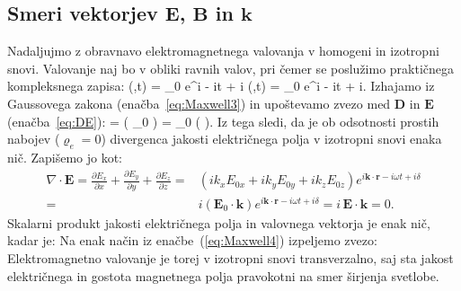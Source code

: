 \subsection*{Smeri vektorjev $\mathbf{E}$, $\mathbf{B}$ in $\mathbf{k}$}
Nadaljujmo z obravnavo elektromagnetnega valovanja v homogeni in izotropni snovi. 
Valovanje naj bo v obliki ravnih valov, pri čemer se poslužimo praktičnega kompleksnega zapisa:
\beq
{}(,t) = _0 e^{i\cdot {} - i\omega t + i\delta}
\qquad {} \qquad
{}(,t) = _0 e^{i\cdot {} - i\omega t + i\delta}.
\label{eq:ravnivalkompleks}
\eeq
Izhajamo iz Gaussovega zakona (enačba~\ref{eq:Maxwell3}) in upoštevamo zvezo med 
$\mathbf{D}$ in $\mathbf{E}$ (enačba~\ref{eq:DE}): 
\beq
\nabla \cdot {} = \nabla \cdot \left( \varepsilon \varepsilon_0 \right) 
= \varepsilon \varepsilon_0 \left(\nabla \cdot {} \right)\!.
\label{eq:03_20}
\eeq
Iz tega sledi, da je ob odsotnosti prostih nabojev ($\varrho_{e} = 0$) divergenca 
jakosti električnega polja v izotropni snovi enaka nič.
Zapišemo jo kot:
\begin{align}
\nabla \cdot \mathbf{E} = \frac{\partial E_x}{\partial x}+ \frac{\partial E_y}{\partial y}+
\frac{\partial E_z}{\partial z} =& \left(ik_xE_{0x} + ik_yE_{0y} + ik_zE_{0z}\right)
e^{i\mathbf{k}\cdot \mathbf{r} - i\omega t + i\delta}\nonumber\\
=& i \left( \mathbf{E}_0 \cdot \mathbf{k} \right) e^{i\mathbf{k}\cdot \mathbf{r} - i\omega t + i\delta} = 
i\, \mathbf{E} \cdot \mathbf{k} = 0.
\label{eq:03_21}
\end{align}
Skalarni produkt jakosti električnega polja in valovnega vektorja je enak nič, kadar je:
Na enak način iz enačbe~(\ref{eq:Maxwell4}) izpeljemo zvezo:
Elektromagnetno valovanje je torej v izotropni snovi transverzalno, saj sta jakost
električnega in gostota magnetnega polja pravokotni na smer širjenja svetlobe.

